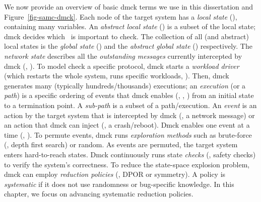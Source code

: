 We now provide an overview of basic dmck terms we use in this dissertation
and Figure~\ref{fig-samc-dmck}.
%
Each node of the target system has a {\em local state} (\ls),
containing many variables.  An {\em abstract local state} (\als) is a
subset of the local state; dmck decides which \als\ is important to
check.
%
The collection of all (and abstract) local states is the {\em global
  state} (\gs) and the {\em abstract global state} (\ags)
respectively.  
%
The {\em network state} describes all the {\em outstanding messages}
currently intercepted by dmck (\eg, ).
%
To model check a specific protocol, dmck starts a {\em workload
  driver} (which restarts the whole system, runs specific workloads,
\etc).  Then, dmck generates many (typically hundreds/thousands)
executions; an {\em execution} (or a {\em path}) is a specific
ordering of events that dmck enables (\eg, , ) from
an initial state to a termination point.
%
A {\em sub-path} is a subset of a path/execution.
%
An {\em event} is an action by the target system that is intercepted
by dmck (\eg, a network message) or an action that dmck can inject
(\eg, a crash/reboot).
%
Dmck enables one event at a time (\eg, ).
%
To permute events, dmck runs {\em exploration methods} such as
brute-force (\eg, depth first search) or random.  
%
%
As events are permuted, the target system enters hard-to-reach
states.  Dmck continuously runs state {\em checks} (\eg, safety 
checks) to verify the system's correctness.
%
To reduce the state-space explosion problem, dmck can employ {\em
  reduction policies} (\eg, DPOR or symmetry).  A policy is {\em
  systematic} if it does not use randomness or bug-specific knowledge.
%
In this chapter, we focus on advancing systematic reduction policies.


